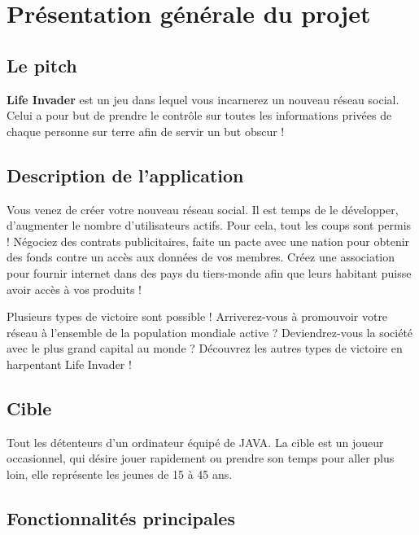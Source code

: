 \chapter{Présentation générale du projet}
\label{chap:premierchapitre}

\section{Le pitch}
\textbf{Life Invader} est un jeu dans lequel vous incarnerez un nouveau réseau social. Celui a pour but de prendre le contrôle sur toutes les informations privées de chaque personne sur terre afin de servir un but obscur !

\section{Description de l'application}

Vous venez de créer votre nouveau réseau social. Il est temps de le développer, d'augmenter le nombre d'utilisateurs actifs. Pour cela, tout les coups sont permis ! Négociez des contrats publicitaires, faite un pacte avec une nation pour obtenir des fonds contre un accès aux données de vos membres. Créez une association pour fournir internet dans des pays du tiers-monde afin que leurs habitant puisse avoir accès à vos produits !

Plusieurs types de victoire sont possible ! Arriverez-vous à promouvoir votre réseau à l'ensemble de la population mondiale active ? Deviendrez-vous la société avec le plus grand capital au monde ? Découvrez les autres types de victoire en harpentant Life Invader !

\section{Cible}

Tout les détenteurs d'un ordinateur équipé de JAVA. La cible est un joueur occasionnel, qui désire jouer rapidement ou prendre son temps pour aller plus loin, elle représente les jeunes de 15 à 45 ans.

\section{Fonctionnalités principales}

